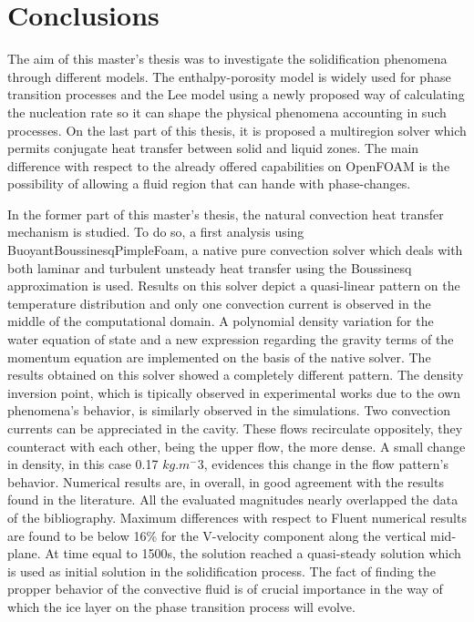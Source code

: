 \chapter{Conclusions} %

\label{Chapter5}
\setlength{\parindent}{0.5cm} The aim of this master's thesis was to investigate the solidification phenomena through different models. The enthalpy-porosity model is widely used for phase transition processes and the Lee model using a newly proposed way of calculating the nucleation rate so it can shape the physical phenomena accounting in such processes. On the last part of this thesis, it is proposed a multiregion solver which permits conjugate heat transfer between solid and liquid zones. The main difference with respect to the already offered capabilities on OpenFOAM is the possibility of allowing a fluid region that can hande with phase-changes. 

\noindent In the former part of this master's thesis, the natural convection heat transfer mechanism is studied. To do so, a first analysis using BuoyantBoussinesqPimpleFoam, a native pure convection solver which deals with both laminar and turbulent unsteady heat transfer using the Boussinesq approximation is used. Results on this solver depict a quasi-linear pattern on the temperature distribution and only one convection current is observed in the middle of the computational domain. A polynomial density variation for the water equation of state and a new expression regarding the gravity terms of the momentum equation are implemented on the basis of the native solver. The results obtained on this solver showed a completely different pattern. The density inversion point, which is tipically observed in experimental works due to the own phenomena's behavior, is similarly observed in the simulations. Two convection currents can be appreciated in the cavity. These flows recirculate oppositely, they counteract with each other, being the upper flow, the more dense. A small change in density, in this case 0.17 $kg.m^-3$, evidences this change in the flow pattern's behavior. Numerical results are, in overall, in good agreement with the results found in the literature. All the evaluated magnitudes nearly overlapped the data of the bibliography. Maximum differences with respect to Fluent numerical results are found to be below 16\% for the V-velocity component along the vertical mid-plane. At time equal to 1500s, the solution reached a quasi-steady solution which is used as initial solution in the solidification process. The fact of finding the propper behavior of the convective fluid is of crucial importance in the way of which the ice layer on the phase transition process will evolve. 


